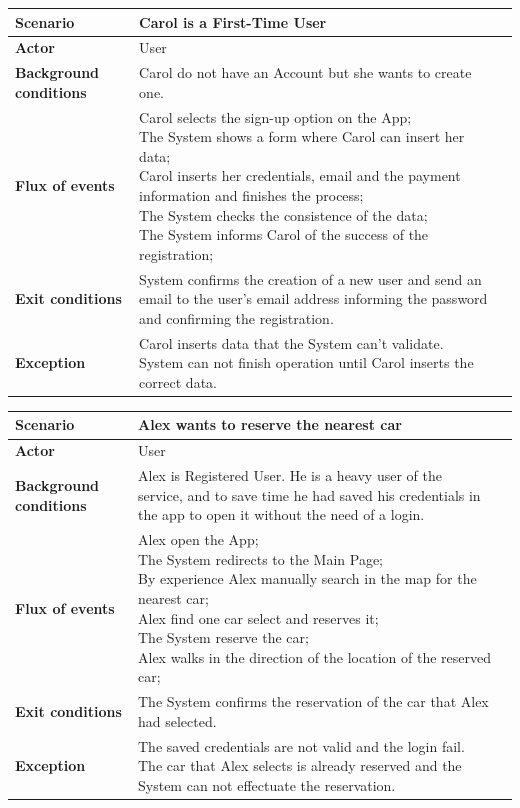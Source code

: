 \documentclass[a4paper]{article}
\begin{document}
\begin{tabular}{ |  l  |   l |  l  |  }
\hline
	\textbf { \textbf{Scenario}} & Carol is a First-Time User\\ \hline
	 \textbf{Actor}& User\\ \hline
	\textbf{Background conditions}&\parbox[t]{8cm}{Carol do not have an Account but she wants to create one. } \\ \hline
	\textbf{Flux of events} & \parbox[t]{8cm}{\textbullet  Carol selects the sign-up option on the App;\\\textbullet The System shows a form where Carol can insert her data;\\\textbullet Carol inserts her credentials, email and the payment information and finishes the process;\\\textbullet  The System checks the consistence of the data;\\\textbullet  The System informs Carol of the success of the registration;}\\ \hline
	\textbf{Exit conditions} &\parbox[t]{8cm}{ System confirms the creation of a new user and send an email to the user's email address informing the password and confirming the registration.}\\ \hline
	\textbf{Exception} & \parbox[t]{8cm}{Carol inserts data that the System can't validate. System can not finish operation until Carol inserts the correct data.   }\\ \hline
\end{tabular}
\newline
\begin{tabular}{ |  l  |   l |  l  |  }
\hline
	\textbf { \textbf{Scenario}} & Alex wants to reserve the nearest car\\ \hline
	 \textbf{Actor}& User\\ \hline
	\textbf{Background conditions}&\parbox[t]{8cm}{Alex is Registered User. He is a heavy user of the service, and to save time he had saved his credentials in the app to open it without the need of a login. } \\ \hline
	\textbf{Flux of events} & \parbox[t]{8cm}{\textbullet  Alex open the App;\\\textbullet  The System redirects to the Main Page;\\\textbullet By experience Alex manually search in the map for the nearest car;\\\textbullet Alex find one car select and reserves it;\\\textbullet 	The System reserve the car;\\\textbullet  Alex walks in the direction of the location of the reserved car; }
  \\ \hline
	\textbf{Exit conditions} &\parbox[t]{8cm}{ The System confirms the reservation of the car that Alex had selected.}\\ \hline
	\textbf{Exception} & \parbox[t]{8cm}{The saved credentials are not valid and the login fail.\\
The car that Alex selects is already reserved and the System can not effectuate the reservation.
}\\ \hline

\end{tabular}
\end{document}
